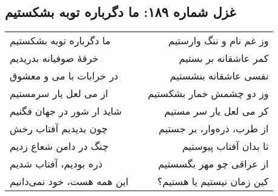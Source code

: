 \begin{center}
\section*{غزل شماره ۱۸۹: ما دگرباره توبه بشکستیم}
\label{sec:189}
\begin{longtable}{l p{0.5cm} r}
ما دگرباره توبه بشکستیم
&&
وز غم نام و ننگ وارستیم
\\
خرقهٔ صوفیانه بدریدیم
&&
کمر عاشقانه بر بستیم
\\
در خرابات با می و معشوق
&&
نفسی عاشقانه بنشستیم
\\
از می لعل یار سرمستیم
&&
وز دو چشمش خمار بشکستیم
\\
شاید ار شور در جهان فگنیم
&&
کر می لعل یار سر مستیم
\\
چون بدیدیم آفتاب رخش
&&
از طرب، ذره‌وار، بر جستیم
\\
چنگ در دامن شعاع زدیم
&&
تا بدان آفتاب پیوستیم
\\
ذره بودیم، آفتاب شدیم
&&
از عراقی چو مهر بگسستیم
\\
این همه هست، خود نمی‌دانیم
&&
کین زمان نیستیم یا هستیم؟
\\
\end{longtable}
\end{center}

